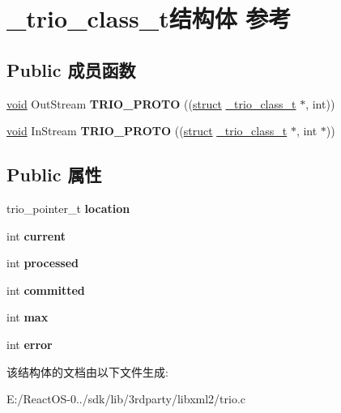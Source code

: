 \hypertarget{struct__trio__class__t}{}\section{\+\_\+trio\+\_\+class\+\_\+t结构体 参考}
\label{struct__trio__class__t}
\subsection*{Public 成员函数}
\begin{DoxyCompactItemize}
\item 
\mbox{\label{struct__trio__class__t_a234b982966fb81fba9a6957a395db8d2}} 
\hyperlink{interfacevoid}{void} Out\+Stream {\bfseries T\+R\+I\+O\+\_\+\+P\+R\+O\+TO} ((\hyperlink{interfacestruct}{struct} \hyperlink{struct__trio__class__t}{\+\_\+trio\+\_\+class\+\_\+t} $\ast$, int))
\item 
\mbox{\label{struct__trio__class__t_a430f92278454c30dd7c98ac542f8370a}} 
\hyperlink{interfacevoid}{void} In\+Stream {\bfseries T\+R\+I\+O\+\_\+\+P\+R\+O\+TO} ((\hyperlink{interfacestruct}{struct} \hyperlink{struct__trio__class__t}{\+\_\+trio\+\_\+class\+\_\+t} $\ast$, int $\ast$))
\end{DoxyCompactItemize}
\subsection*{Public 属性}
\begin{DoxyCompactItemize}
\item 
\mbox{\label{struct__trio__class__t_a1c4f9301b1affb3d6837e3475af74d24}} 
trio\+\_\+pointer\+\_\+t {\bfseries location}
\item 
\mbox{\label{struct__trio__class__t_ac6fe90f898586f9686c0455323d40d70}} 
int {\bfseries current}
\item 
\mbox{\label{struct__trio__class__t_aa8bf7dbf3798bb733b067c6215660c32}} 
int {\bfseries processed}
\item 
\mbox{\label{struct__trio__class__t_ac7eb895c193fbf7ab49e699766b97d28}} 
int {\bfseries committed}
\item 
\mbox{\label{struct__trio__class__t_a9a19d344807ac79ea7ca1248d2833780}} 
int {\bfseries max}
\item 
\mbox{\label{struct__trio__class__t_a30c14d0b86d50adadf78eac80716f9ad}} 
int {\bfseries error}
\end{DoxyCompactItemize}


该结构体的文档由以下文件生成\+:\begin{DoxyCompactItemize}
\item 
E\+:/\+React\+O\+S-\/0../sdk/lib/3rdparty/libxml2/trio.\+c\end{DoxyCompactItemize}
